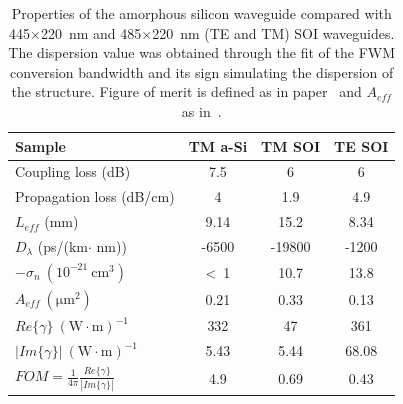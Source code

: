 \documentclass[10pt,letterpaper]{article}
\begin{document}
\begin{table}
\centering
\caption{Properties of the amorphous silicon waveguide compared with 445$\times$220~nm and 485$\times$220~nm (TE and TM) SOI waveguides. The dispersion value was obtained through the fit of the FWM conversion bandwidth and its sign simulating the dispersion of the structure. Figure of merit is defined as in paper~\cite{Koos2007} and ${A}_{eff}$ as in~\cite{Rukhlenko2012}.}
\begin{tabular}{l|ccc}
\hline
Sample & TM a-Si & TM SOI & TE SOI \\\hline
Coupling loss (dB) & 7.5 & 6 & 6\\
Propagation loss (dB/cm) & 4 & 1.9 & 4.9\\
$L_{eff}$ (mm) & 9.14 & 15.2 & 8.34\\
$D_\lambda$ (ps/(km$\cdot$ nm)) & -6500 & -19800 & -1200\\
$-\sigma_n ~ (10^{-21}~\mathrm{cm}^3) $  & \textless~1 & 10.7 & 13.8 \\ 
$ {A}_{eff}~ (\mathrm{\mu m}^2) $  & 0.21 & 0.33 & 0.13 \\ 
{$Re\{\gamma\} ~ (\mathrm{W}\cdot \mathrm{m})^{-1}$ } & 332 & 47 & 361\\
{$|Im\{\gamma\}| ~ (\mathrm{W}\cdot \mathrm{m})^{-1}$ } & 5.43 & 5.44 & 68.08\\
$ FOM = \frac{1}{4\pi} \frac{Re\{\gamma\}}{|Im\{\gamma\}|} $ & 4.9 & 0.69 & 0.43\\
\hline
\end{tabular}
\label{tab:results}
\end{table}

\end{document}
